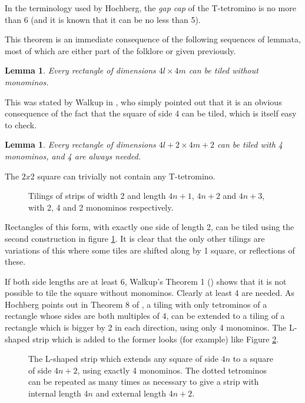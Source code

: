 \documentclass{article}
\theoremstyle{plain}
\newtheorem{lemma}[theorem]{Lemma}
\begin{document}
In the terminology used by Hochberg, the \emph{gap cap} of the T-tetromino is no more than 6 (and it is known that it can be no less than 5).

This theorem is an immediate consequence of the following sequences of lemmata, most of which are either part of the folklore or given previously.

\begin{lemma}
Every rectangle of dimensions $4l \times 4m$ can be tiled without monominos.
\end{lemma}
This was stated by Walkup in \cite{walkup}, who simply pointed out that it is an obvious consequence of the fact that the square of side 4 can be tiled, which is itself easy to check.

\begin{lemma}
Every rectangle of dimensions $4l + 2 \times 4m + 2$ can be tiled with 4 monominos, and 4 are always needed.
\end{lemma}
The $2x2$ square can trivially not contain any T-tetromino.

\begin{figure}

\caption{Tilings of strips of width 2 and length $4n + 1$, $4n+2$ and $4n+3$, with 2, 4 and 2 monominos respectively.}
\label{strips}
\end{figure}

Rectangles of this form, with exactly one side of length 2, can be tiled using the second construction in figure \ref{strips}. It is clear that the only other tilings are variations of this where some tiles are shifted along by 1 square, or reflections of these.

If both side lengths are at least $6$, Walkup's Theorem 1 (\cite{walkup}) shows that it is not possible to tile the square without monominos.
Clearly at least 4 are needed.
As Hochberg points out in Theorem 8 of \cite{hochberg}, a tiling with only tetrominos of a rectangle whose sides are both multiples of 4, can be extended to a tiling of a rectangle which is bigger by 2 in each direction, using only 4 monominos.
The L-shaped strip which is added to the former looks (for example) like Figure \ref{lshaped}.

\begin{figure}

\caption{The L-shaped strip which extends any square of side $4n$ to a square of side $4n+2$, using exactly 4 monominos. The dotted tetrominos can be repeated as many times as necessary to give a strip with internal length $4n$ and external length $4n + 2$.}
\label{lshaped}
\end{figure}
\end{document}
